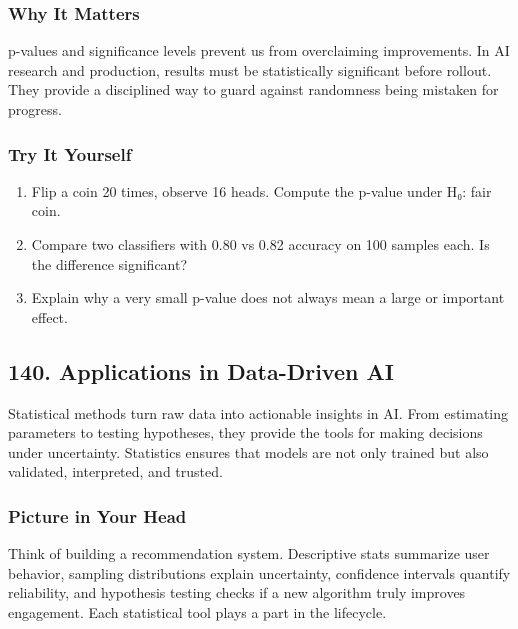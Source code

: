 \documentclass[
  letterpaper,
  DIV=11,
  numbers=noendperiod]{scrreprt}
\providecommand{\tightlist}{%
  \setlength{\itemsep}{0pt}\setlength{\parskip}{0pt}}
\begin{document}
\subsubsection{Why It Matters}\label{why-it-matters-36}

p-values and significance levels prevent us from overclaiming
improvements. In AI research and production, results must be
statistically significant before rollout. They provide a disciplined way
to guard against randomness being mistaken for progress.

\subsubsection{Try It Yourself}\label{try-it-yourself-138}

\begin{enumerate}
\def\labelenumi{\arabic{enumi}.}
\tightlist
\item
  Flip a coin 20 times, observe 16 heads. Compute the p-value under H₀:
  fair coin.
\item
  Compare two classifiers with 0.80 vs 0.82 accuracy on 100 samples
  each. Is the difference significant?
\item
  Explain why a very small p-value does not always mean a large or
  important effect.
\end{enumerate}

\subsection{140. Applications in Data-Driven
AI}\label{applications-in-data-driven-ai}

Statistical methods turn raw data into actionable insights in AI. From
estimating parameters to testing hypotheses, they provide the tools for
making decisions under uncertainty. Statistics ensures that models are
not only trained but also validated, interpreted, and trusted.

\subsubsection{Picture in Your Head}\label{picture-in-your-head-139}

Think of building a recommendation system. Descriptive stats summarize
user behavior, sampling distributions explain uncertainty, confidence
intervals quantify reliability, and hypothesis testing checks if a new
algorithm truly improves engagement. Each statistical tool plays a part
in the lifecycle.
\end{document}
